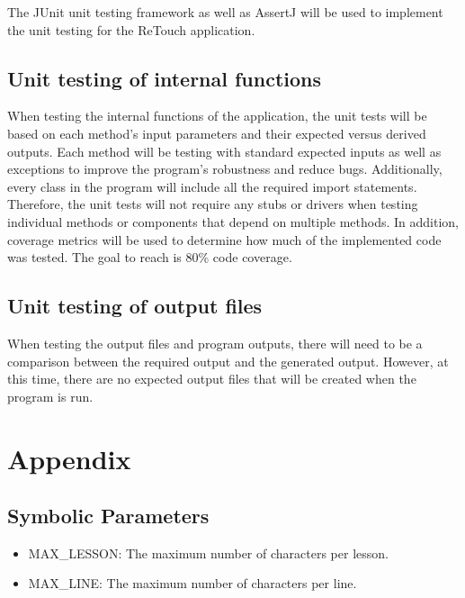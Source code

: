 \documentclass[12pt, titlepage]{article}
\begin{document}
The JUnit unit testing framework {\color{cyan}as well as AssertJ} will be used to implement the unit testing for the ReTouch application.
		
\subsection{Unit testing of internal functions}

When testing the internal functions of the application, the unit tests will be based on each method's input parameters and their expected versus derived outputs. Each method will be testing with standard expected inputs as well as exceptions to improve the program's robustness and reduce bugs. Additionally, every class in the program will include all the required import statements. Therefore, the unit tests will not require any stubs or drivers when testing individual methods or components that depend on multiple methods. In addition, coverage metrics will be used to determine how much of the implemented code was tested. The goal to reach is 80\% code coverage. 
		
\subsection{Unit testing of output files}

When testing the output files and program outputs, there will need to be a comparison between the required output and the generated output. However, at this time, there are no expected output files that will be created when the program is run. 		

\newpage

\section{Appendix}

\subsection{Symbolic Parameters}
\label{symbols}

\begin{itemize}
\item MAX\_LESSON: The maximum number of characters per lesson.
\item MAX\_LINE: The maximum number of characters per line.
\end{itemize}
\end{document}
